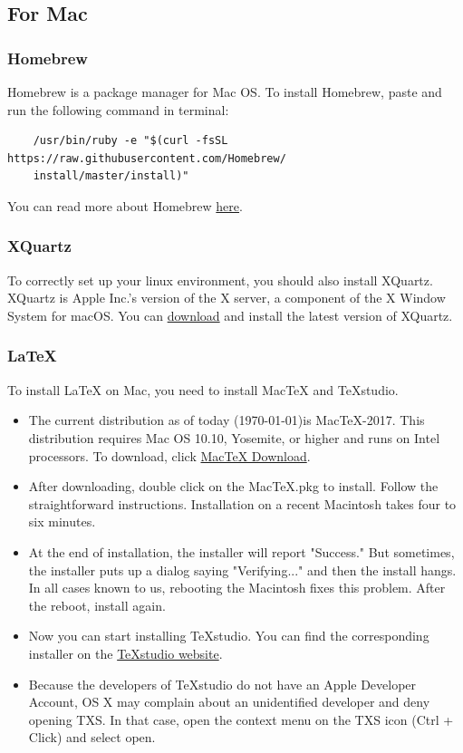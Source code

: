 \documentclass[11pt]{article} %
\begin{document}
  \subsection{For Mac}
  
    \subsubsection{Homebrew}
    Homebrew is a package manager for Mac OS. 
    To install Homebrew, paste and run the following command in terminal:
    \begin{lstlisting}
    /usr/bin/ruby -e "$(curl -fsSL https://raw.githubusercontent.com/Homebrew/
    install/master/install)"
    \end{lstlisting}
    You can read more about Homebrew \href{https://brew.sh/}{here}.
    \subsubsection{XQuartz}
    To correctly set up your linux environment, you should also install XQuartz.
    XQuartz is Apple Inc.'s version of the X server, a component of the X Window System for macOS. 
    You can \href{https://www.xquartz.org/}{download} and install the latest version of XQuartz. 
    \subsubsection{LaTeX}
    To install LaTeX on Mac, you need to install MacTeX and TeXstudio. 
    \begin{itemize}
    	\item The current distribution as of today (\today)is MacTeX-2017. 
      This distribution requires Mac OS 10.10, Yosemite, or higher and runs on Intel processors. 
      To download, click \href{http://www.tug.org/mactex/mactex-download.html}{MacTeX Download}. 
    	\item After downloading, double click on the MacTeX.pkg to install. 
      Follow the straightforward instructions. 
      Installation on a recent Macintosh takes four to six minutes. 
    	\item At the end of installation, the installer will report "Success." But sometimes, the installer puts up a dialog saying "Verifying..." and then the install hangs. 
      In all cases known to us, rebooting the Macintosh fixes this problem. 
      After the reboot, install again. 
    	\item Now you can start installing TeXstudio. 
      You can find the corresponding installer on the \href{https://www.texstudio.org/}{TeXstudio website}. 
    	\item Because the developers of TeXstudio do not have an Apple Developer Account, OS X may complain about an unidentified developer and deny opening TXS. 
      In that case, open the context menu on the TXS icon (Ctrl + Click) and select open. 
    \end{itemize} 
    
\end{document}
